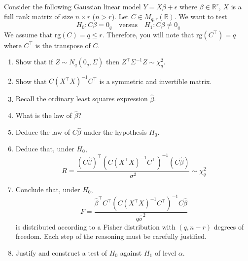 \begin{exercise}
Consider the following Gaussian linear model \(Y = X\beta + \epsilon\) where \(\beta \in \mathbb{R}^r\), \(X\) is a full rank matrix of size \(n \times r\) (\(n > r\)). Let \(C \in M_{q,r}(\mathbb{R})\). We want to test
\[H_0 : C\beta = 0_q \quad \text{versus} \quad H_1 : C\beta \neq 0_q\]
We assume that \(\text{rg}(C) = q \leq r\). Therefore, you will note that \(\text{rg}(C^{\top}) = q\) where \(C^{\top}\) is the transpose of \(C\).

\begin{enumerate}
    \item Show that if \(Z \sim N_q(0_q, \Sigma)\) then \(Z^{\top}\Sigma^{-1}Z \sim \chi^2_q\).

    \item Show that \(C(X^{\top}X)^{-1}C^{\top}\) is a symmetric and invertible matrix.

    \item Recall the ordinary least squares expression \(\hat{\beta}\).

    \item What is the law of \(\hat{\beta}\)?

    \item Deduce the law of \(C\hat{\beta}\) under the hypothesis \(H_0\).

    \item Deduce that, under \(H_0\),
    \[R = \frac{(C\hat{\beta})^{\top}(C(X^{\top}X)^{-1}C^{\top})^{-1}(C\hat{\beta})}{\sigma^2} \sim \chi^2_q\]

    \item Conclude that, under \(H_0\),
    \[F = \frac{\hat{\beta}^{\top}C^{\top}(C(X^{\top}X)^{-1}C^{\top})^{-1}C\hat{\beta}}{q\hat{\sigma}^2}\]
    is distributed according to a Fisher distribution with \((q, n - r)\) degrees of freedom. Each step of the reasoning must be carefully justified.

    \item Justify and construct a test of \(H_0\) against \(H_1\) of level \(\alpha\).
\end{enumerate}
\end{exercise}

